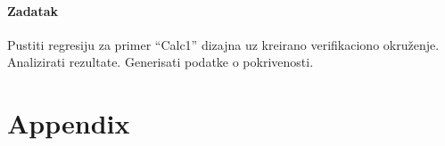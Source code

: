 \paragraph{Zadatak}

Pustiti regresiju za primer ``Calc1'' dizajna uz kreirano verifikaciono
okruženje. Analizirati rezultate. Generisati podatke o pokrivenosti.


\section{Appendix}

